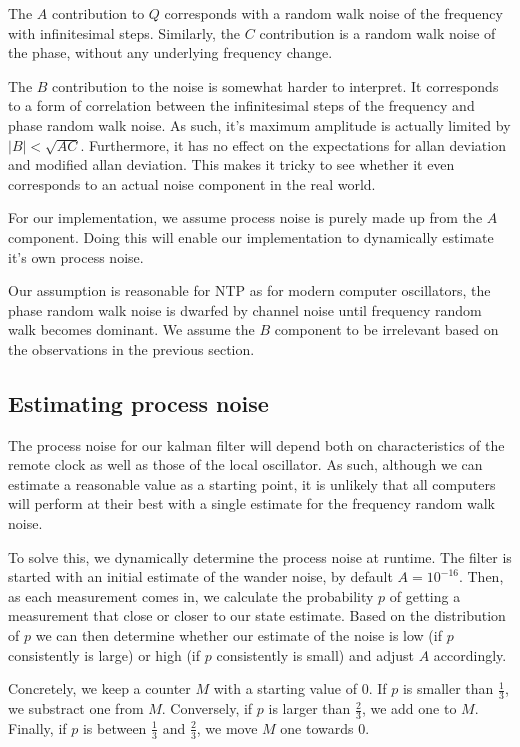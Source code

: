 \documentclass{article}
\begin{document}
The $A$ contribution to $Q$ corresponds with a random walk noise of the frequency with infinitesimal steps.
Similarly, the $C$ contribution is a random walk noise of the phase, without any underlying frequency change.

The $B$ contribution to the noise is somewhat harder to interpret. It corresponds to a form of correlation between the infinitesimal steps
of the frequency and phase random walk noise. As such, it's maximum amplitude is actually limited by $|B| < \sqrt{AC}$.
Furthermore, it has no effect on the expectations for allan deviation and modified allan deviation.
This makes it tricky to see whether it even corresponds to an actual noise component in the real world.

For our implementation, we assume process noise is purely made up from the $A$ component. Doing this will enable our implementation to dynamically
estimate it's own process noise.

Our assumption is reasonable for NTP as for modern computer oscillators, the phase random walk noise is dwarfed by channel noise until frequency random
walk becomes dominant. 
We assume the $B$ component to be irrelevant based on the observations in the previous section.

\subsection{Estimating process noise}

The process noise for our kalman filter will depend both on characteristics of the remote clock as well as those of the local oscillator.
As such, although we can estimate a reasonable value as a starting point, it is unlikely that all computers will perform at their best with
a single estimate for the frequency random walk noise.

To solve this, we dynamically determine the process noise at runtime.
The filter is started with an initial estimate of the wander noise, by default $A=10^{-16}$.
Then, as each measurement comes in, we calculate the probability $p$ of getting a measurement that close or closer to our state estimate.
Based on the distribution of $p$ we can then determine whether our estimate of the noise is low (if $p$ consistently is large) or high (if $p$ consistently is small) and adjust $A$ accordingly.

Concretely, we keep a counter $M$ with a starting value of $0$. If $p$ is smaller than $\frac{1}{3}$, we substract one from $M$.
Conversely, if $p$ is larger than $\frac{2}{3}$, we add one to $M$. Finally, if $p$ is between $\frac{1}{3}$ and $\frac{2}{3}$, we move $M$ one towards $0$.
\end{document}
